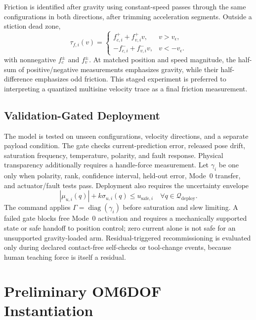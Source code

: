 \documentclass[conference]{IEEEtran}
\begin{document}
Friction is identified after gravity using constant-speed passes through the
same configurations in both directions, after trimming acceleration segments.
Outside a stiction dead zone,
\begin{equation}
 \tau_{f,i}(v)=
 \begin{cases}
 f_{c,i}^{+}+f_{v,i}^{+}v,&v>v_\epsilon,\\
 -f_{c,i}^{-}+f_{v,i}^{-}v,&v<-v_\epsilon.
 \end{cases}
 \label{eq:friction}
\end{equation}
with nonnegative $f_c^{\pm}$ and $f_v^{\pm}$.
At matched position and speed magnitude, the half-sum of positive/negative
measurements emphasizes gravity, while their half-difference emphasizes odd
friction. This staged experiment is preferred to interpreting a quantized
multisine velocity trace as a final friction measurement.

\subsection{Validation-Gated Deployment}
The model is tested on unseen configurations, velocity directions, and a
separate payload condition. The gate checks current-prediction error, released
pose drift, saturation frequency, temperature, polarity, and fault response.
Physical transparency additionally requires a handle-force measurement. Let
$\gamma_i$ be one only when polarity, rank, confidence interval, held-out
error, Mode~0 transfer, and actuator/fault tests pass. Deployment also requires
the uncertainty envelope
\begin{equation}
 |\mu_{u,i}(q)|+k\sigma_{u,i}(q)\le u_{\mathrm{safe},i}
 \quad\forall q\in\mathcal Q_{\mathrm{deploy}}.
 \label{eq:validation_gate}
\end{equation}
The command applies $\Gamma=\operatorname{diag}(\gamma_i)$ before saturation
and slew limiting. A failed gate blocks free Mode~0 activation and requires a
mechanically supported state or safe handoff to position control; zero current
alone is not safe for an unsupported gravity-loaded arm. Residual-triggered
recommissioning is evaluated only during declared contact-free self-checks or
tool-change events, because human teaching force is itself a residual.

\section{Preliminary OM6DOF Instantiation}
\end{document}
